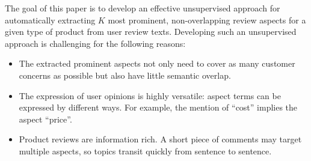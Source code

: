 
%

The goal of this paper is to develop an effective unsupervised approach for automatically extracting $K$ most prominent, non-overlapping review aspects for a given type of product from user review texts.  
Developing such an unsupervised approach is challenging for 
the following reasons: 
\begin{itemize}
    \item 
	The extracted prominent aspects not only need to cover as many customer concerns as possible but also have little semantic overlap.
	
    \item The expression of user opinions is highly versatile: 
    aspect terms can be expressed by different ways. 
    For example, the mention of ``cost'' implies the aspect ``price''.
    \item Product reviews are information rich. A short piece of comments may target multiple aspects, so topics transit quickly from sentence to sentence. 
\end{itemize}

